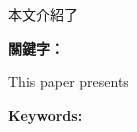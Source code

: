 \begin{abstractzh}




    本文介紹了

\bigbreak
\noindent \textbf{關鍵字：}{\, \makeatletter \@keywordszh \makeatother}
\end{abstractzh}

\begin{abstracten}

    This paper presents 

\bigbreak
\noindent \textbf{Keywords:}{\, \makeatletter \@keywordsen \makeatother}
\end{abstracten}

